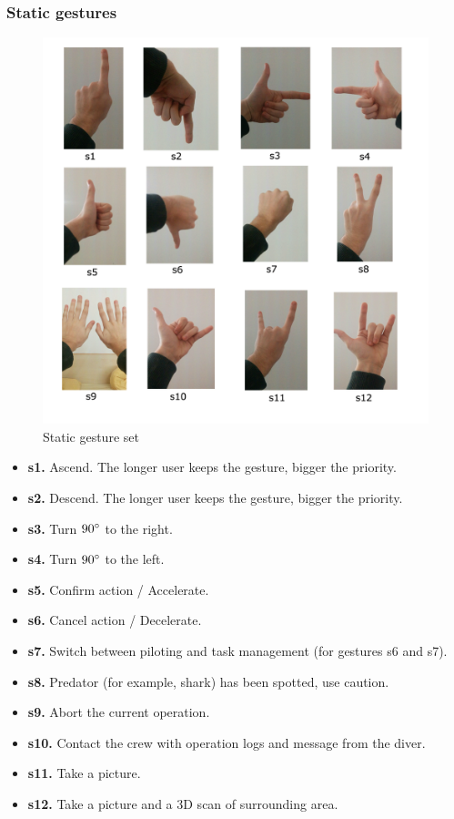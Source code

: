\documentclass[a4paper,11pt,oneside]{article}
\begin{document}
    \subsubsection{Static gestures}
    
  \begin{figure}[H]
  \centering
  \includegraphics[scale=0.4]{static-gestureset.png}
  \caption{Static gesture set}
  \end{figure}
    
    \begin{itemize}
    \item \textbf{s1.} Ascend. The longer user keeps the gesture, bigger the priority.
    \item \textbf{s2.} Descend. The longer user keeps the gesture, bigger the priority.
    \item \textbf{s3.} Turn $90\degree$ to the right.
    \item \textbf{s4.} Turn $90\degree$ to the left.
    \item \textbf{s5.} Confirm action / Accelerate.
    \item \textbf{s6.} Cancel action / Decelerate.
    \item \textbf{s7.} Switch between piloting and task management (for gestures s6 and s7).
    \item \textbf{s8.} Predator (for example, shark) has been spotted, use caution.
    \item \textbf{s9.} Abort the current operation.
    \item \textbf{s10.} Contact the crew with operation logs and message from the diver.
    \item \textbf{s11.} Take a picture.
    \item \textbf{s12.} Take a picture and a 3D scan of surrounding area.
    \end{itemize}
    
\end{document}
